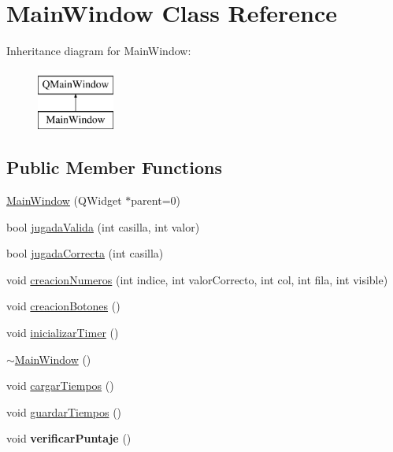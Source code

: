 \hypertarget{class_main_window}{\section{Main\-Window Class Reference}
\label{class_main_window}
}
Inheritance diagram for Main\-Window\-:\begin{figure}[H]
\begin{center}
\leavevmode
\includegraphics[height=2.000000cm]{class_main_window}
\end{center}
\end{figure}
\subsection*{Public Member Functions}
\begin{DoxyCompactItemize}
\item 
\hyperlink{class_main_window_a8b244be8b7b7db1b08de2a2acb9409db}{Main\-Window} (Q\-Widget $\ast$parent=0)
\item 
bool \hyperlink{class_main_window_adb7dbe0ece2eaa1a92b3ee1da8ae3327}{jugada\-Valida} (int casilla, int valor)
\item 
bool \hyperlink{class_main_window_ab68ff992b159d33b1f80606deabe0361}{jugada\-Correcta} (int casilla)
\item 
void \hyperlink{class_main_window_a18e451ac33947c4e8c058a5266daafbd}{creacion\-Numeros} (int indice, int valor\-Correcto, int col, int fila, int visible)
\item 
void \hyperlink{class_main_window_af0799066013e5dac6614367dc715d3e4}{creacion\-Botones} ()
\item 
void \hyperlink{class_main_window_ade1681f57a1c4cacefd88030c3f70b23}{inicializar\-Timer} ()
\item 
\hyperlink{class_main_window_ae98d00a93bc118200eeef9f9bba1dba7}{$\sim$\-Main\-Window} ()
\item 
void \hyperlink{class_main_window_a08acc9988dda5fc7dea6929509a5b4d6}{cargar\-Tiempos} ()
\item 
void \hyperlink{class_main_window_a3d3b2dae4418a86ac8181be427f7947e}{guardar\-Tiempos} ()
\item 
\hypertarget{class_main_window_a688f2e2fa0cfa0da33f6ba0ba4283f46}{void {\bfseries verificar\-Puntaje} ()}\label{class_main_window_a688f2e2fa0cfa0da33f6ba0ba4283f46}

\end{DoxyCompactItemize}


